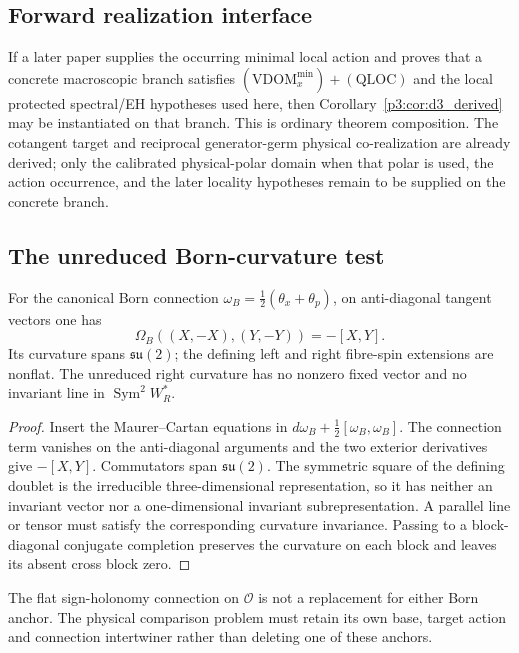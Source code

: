 \documentclass[11pt,a4paper]{article}
\begin{document}
\subsection{Forward realization interface}
\label{p3f:app:forward-realization}
If a later paper supplies the occurring minimal local action and proves that a
concrete macroscopic branch satisfies
\((\mathrm{VDOM}_x^{\min})+(\mathrm{QLOC})\) and the local protected
spectral/EH hypotheses used here, then
Corollary~\ref{p3:cor:d3_derived} may be instantiated on that branch.  This is ordinary theorem composition.  The cotangent target and reciprocal generator-germ physical co-realization
are already derived; only the calibrated physical-polar domain when that polar
is used, the action occurrence, and the later locality hypotheses remain to
be supplied on the concrete branch.

\subsection{The unreduced Born-curvature test}
\label{p3f:app:born-comparison-curvature-test}
\begin{proposition}
\label{paper3g:proposition:atlas-curvature-and-conjugate-completion-bbc8aec}

For the canonical Born connection
\(\omega_B=\tfrac12(\theta_x+\theta_p)\), on anti-diagonal tangent
vectors one has
\[
 \Omega_B((X,-X),(Y,-Y))=-[X,Y].
\]
Its curvature spans \(\mathfrak{su}(2)\); the defining left and
right fibre-spin extensions are nonflat.  The unreduced right
curvature has no nonzero fixed vector and no invariant line in
\(\operatorname{Sym}^2W_R^*\).
\end{proposition}
\begin{proof}
Insert the Maurer--Cartan equations in
\(d\omega_B+\tfrac12[\omega_B,\omega_B]\).
The connection term vanishes on the anti-diagonal arguments and
the two exterior derivatives give \(-[X,Y]\).
Commutators span \(\mathfrak{su}(2)\).  The symmetric square of
the defining doublet is the irreducible three-dimensional
representation, so it has neither an invariant vector nor a
one-dimensional invariant subrepresentation.  A parallel line or
tensor must satisfy the corresponding curvature invariance.
Passing to a block-diagonal conjugate completion preserves the
curvature on each block and leaves its absent cross block zero.
\end{proof}

The flat sign-holonomy connection on \(\mathcal O\) is not a
replacement for either Born anchor.  The physical comparison
problem must retain its own base, target action and connection
intertwiner rather than deleting one of these anchors.
\end{document}
